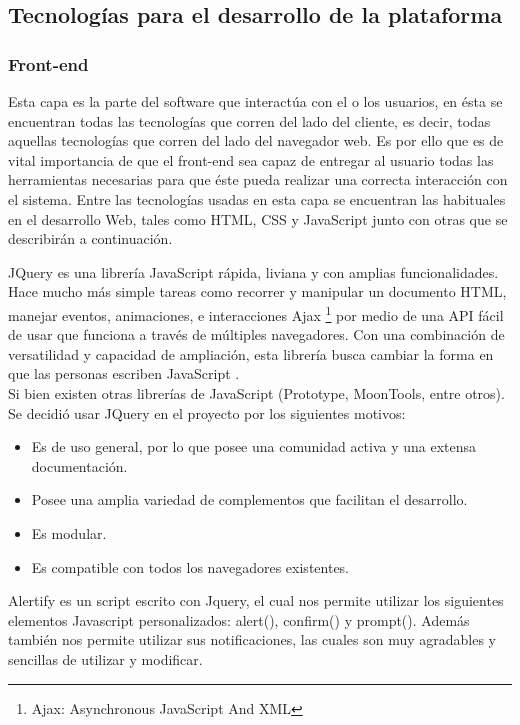 \subsection{Tecnologías para el desarrollo de la plataforma}

\subsubsection{Front-end}

Esta capa es la parte del software que interactúa con el o los usuarios, en ésta  se encuentran todas las tecnologías que corren del lado del cliente, es decir, todas aquellas tecnologías que corren del lado del navegador web. Es por ello que es de vital importancia de que el front-end sea capaz de entregar  al usuario todas las herramientas necesarias para que éste pueda realizar una correcta interacción con el sistema. Entre las tecnologías usadas en esta capa se encuentran las habituales en el desarrollo Web, tales como HTML, CSS y JavaScript junto con otras que se describirán a continuación.


JQuery es una librería JavaScript rápida, liviana y con amplias funcionalidades. Hace mucho más simple tareas como recorrer y manipular un documento HTML, manejar eventos, animaciones, e interacciones Ajax	\footnote{Ajax: Asynchronous JavaScript And XML} por medio de una API fácil de usar que funciona a través de múltiples navegadores. Con una combinación de versatilidad y capacidad de ampliación, esta librería busca cambiar la forma en que las personas escriben JavaScript \cite{JQu15}.
\\

Si bien existen otras librerías de JavaScript (Prototype, MoonTools, entre otros). Se decidió usar JQuery en el proyecto por los siguientes motivos:
\begin{itemize}
	\item Es de uso general, por lo que posee una comunidad activa y una extensa documentación.
	\item Posee una amplia variedad de complementos que facilitan el desarrollo.
	\item Es modular.
	\item Es compatible con todos los navegadores existentes.
\end{itemize}



Alertify es un script escrito con Jquery, el cual nos permite utilizar los siguientes elementos Javascript personalizados: alert(), confirm() y prompt(). Además también nos permite utilizar sus notificaciones, las cuales son muy agradables y sencillas de utilizar y modificar\cite{ALE15}.
\\

